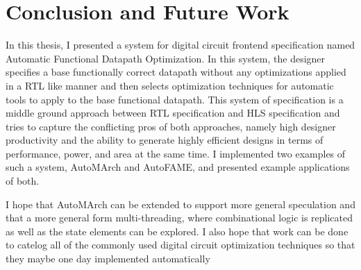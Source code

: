 \section{Conclusion and Future Work}
In this thesis, I presented a system for digital circuit frontend specification named Automatic Functional Datapath Optimization. In this system, the designer specifies a base functionally correct datapath without any optimizations applied in a RTL like manner and then selects optimization techniques for automatic tools to apply to the base functional datapath. This system of specification is a middle ground approach between RTL specification and HLS specification and tries to capture the conflicting pros of both approaches, namely high designer productivity and the ability to generate highly efficient designs in terms of performance, power, and area at the same time. I implemented two examples of such a system, AutoMArch and AutoFAME, and presented example applications of both.

I hope that AutoMArch can be extended to support more general speculation and that a more general form multi-threading, where combinational logic is replicated as well as the state elements can be explored. I also hope that work can be done to catelog all of the commonly used digital circuit optimization techniques so that they maybe one day implemented automatically
